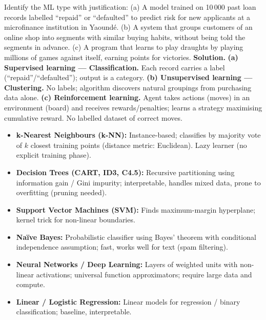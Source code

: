 \documentclass[11pt]{article}
\begin{document}
\begin{exoresolu}
Identify the ML type with justification:
(a) A model trained on 10\,000 past loan records labelled ``repaid'' or ``defaulted'' to predict risk for new applicants at a microfinance institution in Yaoundé.
(b) A system that groups customers of an online shop into segments with similar buying habits, without being told the segments in advance.
(c) A program that learns to play draughts by playing millions of games against itself, earning points for victories.
\tcblower
\textbf{Solution.}
\textbf{(a) Supervised learning — Classification.} Each record carries a label (``repaid''/``defaulted''); output is a category.
\textbf{(b) Unsupervised learning — Clustering.} No labels; algorithm discovers natural groupings from purchasing data alone.
\textbf{(c) Reinforcement learning.} Agent takes actions (moves) in an environment (board) and receives rewards/penalties; learns a strategy maximising cumulative reward. No labelled dataset of correct moves.
\end{exoresolu}

\begin{definition}
\begin{itemize}
\item \textbf{k-Nearest Neighbours (k-NN):} Instance-based; classifies by majority vote of $k$ closest training points (distance metric: Euclidean). Lazy learner (no explicit training phase).
\item \textbf{Decision Trees (CART, ID3, C4.5):} Recursive partitioning using information gain / Gini impurity; interpretable, handles mixed data, prone to overfitting (pruning needed).
\item \textbf{Support Vector Machines (SVM):} Finds maximum-margin hyperplane; kernel trick for non-linear boundaries.
\item \textbf{Naïve Bayes:} Probabilistic classifier using Bayes' theorem with conditional independence assumption; fast, works well for text (spam filtering).
\item \textbf{Neural Networks / Deep Learning:} Layers of weighted units with non-linear activations; universal function approximators; require large data and compute.
\item \textbf{Linear / Logistic Regression:} Linear models for regression / binary classification; baseline, interpretable.
\end{itemize}
\end{definition}
\end{document}
